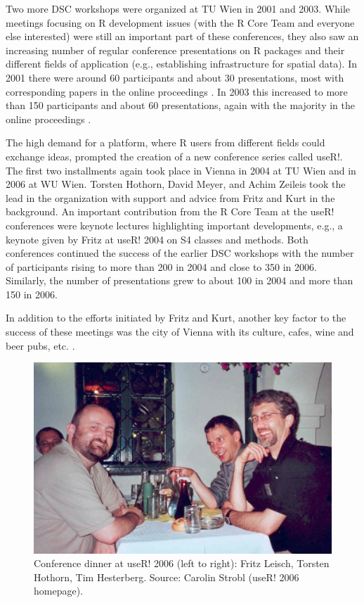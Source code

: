 Two more DSC workshops were organized at TU Wien
in 2001 and 2003. While meetings focusing on R development issues (with the
R Core Team and everyone else interested) were still an important part of
these conferences, they also saw an increasing number of regular conference
presentations on R packages and their different fields of application
(e.g., establishing infrastructure for spatial data). In 2001 there were
around 60 participants and about 30 presentations, most with corresponding
papers in the online proceedings \citep{Hornik+Leisch:2001}. In 2003 this
increased to more than 150 participants and about 60 presentations, again
with the majority in the online proceedings \citep{Hornik+Leisch+Zeileis:2003}.

The high demand for a platform, where R users from different fields could
exchange ideas, prompted the creation of a new conference series called
useR!. The first two installments again took place in Vienna in 2004
at TU Wien and in 2006 at WU Wien.
Torsten Hothorn, David Meyer, and Achim Zeileis took the lead in the
organization with support and advice from Fritz and Kurt in the background.
An important contribution from the R Core Team at the useR! conferences
were keynote lectures highlighting important developments, e.g., a keynote
given by Fritz at useR! 2004 on S4 classes and methods. Both conferences
continued the success of the earlier DSC workshops with the number of
participants rising to more than 200 in 2004 and close to 350 in 2006.
Similarly, the number of presentations grew to about 100 in 2004 and more
than 150 in 2006.

In addition to the efforts initiated by Fritz and Kurt, another key factor
to the success of these meetings was the city of Vienna with its culture,
cafes, wine and beer pubs, etc. \citep[see][ and also
Figure~\ref{fig:user2006}]{Hornik+Leisch:2002}.

\begin{figure}[t!]

{\centering \includegraphics[width=0.83\linewidth]{figures/img-user2006} 

}

\caption{Conference dinner at useR! 2006 (left to right): Fritz Leisch, Torsten Hothorn, Tim Hesterberg. Source: Carolin Strobl (useR! 2006 homepage).}\label{fig:user2006}
\end{figure}

